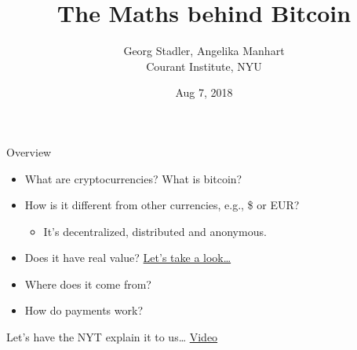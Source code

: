 \documentclass[12pt]{beamer}
\title{{\bf The Maths behind Bitcoin }}
\date{Aug 7, 2018}
\author{Georg Stadler, Angelika Manhart \\ Courant Institute, NYU}
\theoremstyle{definition}
\numberwithin{equation}{section}
\begin{document}
\begin{frame}
\maketitle
\end{frame}


\begin{frame}{Overview}
  \begin{itemize}
  \item What are cryptocurrencies? What is bitcoin?\\[3ex]
    \pause
  \item How is it different from other currencies, e.g., \$ or EUR? \\[1ex]
    \pause
    \begin{itemize}
      \item It's decentralized, distributed and anonymous.\\[1ex]
    \end{itemize}
    \pause
  \item Does it have real value?
    \href{https://www.coindesk.com/price/}{Let's take a look\ldots}\\[3ex]
    \pause
  \item Where does it come from?\\[3ex]
    \pause
  \item How do payments work?
  \end{itemize}
\end{frame}


\begin{frame}{Let's have the NYT explain it to us\ldots}
\centering
  \href{https://www.nytimes.com/video/business/100000005675385/baffled-by-bitcoin-heres-how-cryptocurrency-works.html?smid=pl-share}{\Large
    Video}\\[3ex]  
\end{frame}
\end{document}
